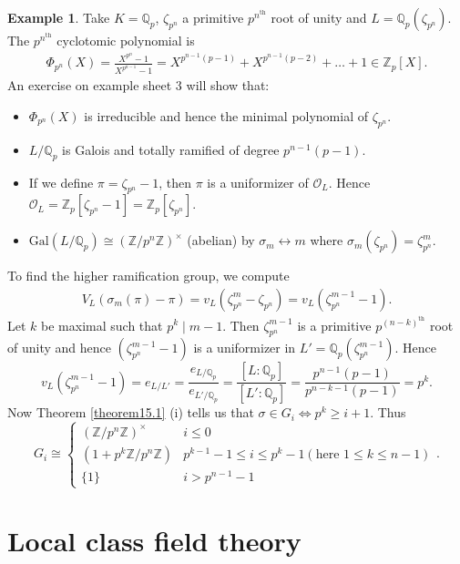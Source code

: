 \documentclass{article}
\theoremstyle{definition}
\newtheorem{example}{Example}[section]
\begin{document}
\begin{example}
    Take $K = \mathbb{Q}_p$, $\zeta_{p^n}$ a primitive $p^{n^{\text{th}}}$ root of unity and $L = \mathbb{Q}_p(\zeta_{p^n})$. The $p^{n^{\text{th}}}$ cyclotomic polynomial is \begin{align*}
        \Phi_{p^n}(X) = \frac{X^{p^n}-1}{X^{p^{n-1}}-1} = X^{p^{n-1}(p-1)} + X^{p^{n-1}(p-2)} + \ldots + 1 \in \mathbb{Z}_p[X].
    \end{align*}
    An exercise on example sheet 3 will show that:
    \begin{itemize}
        \item $\Phi_{p^n}(X)$ is irreducible and hence the minimal polynomial of $\zeta_{p^n}$.
        \item $L/\mathbb{Q}_p$ is Galois and totally ramified of degree $p^{n-1}(p-1)$.
        \item If we define $\pi = \zeta_{p^n}-1$, then $\pi$ is a uniformizer of $\mathcal{O}_L$. Hence $\mathcal{O}_L = \mathbb{Z}_p[\zeta_{p^n}-1] = \mathbb{Z}_p[\zeta_{p^n}]$.
        \item $\text{Gal}(L/\mathbb{Q}_p) \cong (\mathbb{Z}/p^n \mathbb{Z})^\times$ (abelian) by $\sigma_m \leftrightarrow m$ where $\sigma_m(\zeta_{p^n})=\zeta_{p^n}^m$.
    \end{itemize}
    To find the higher ramification group, we compute
    \begin{align*}
        V_L(\sigma_m(\pi)-\pi) = v_L(\zeta_{p^n}^m - \zeta_{p^n}) = v_L(\zeta_{p^n}^{m-1}-1).
    \end{align*}
    Let $k$ be maximal such that $p^k \mid m-1$. Then $\zeta_{p^n}^{m-1}$ is a primitive $p^{(n-k)^{\text{th}}}$ root of unity and hence $(\zeta_{p^n}^{m-1}-1)$ is a uniformizer in $L' = \mathbb{Q}_p(\zeta_{p^n}^{m-1})$. Hence $$v_L(\zeta_{p^n}^{m-1}-1) = e_{L/L'} = \frac{e_{L/\mathbb{Q}_p}}{e_{L'/\mathbb{Q}_p}} = \frac{[L:\mathbb{Q}_p]}{[L':\mathbb{Q}_p]} = \frac{p^{n-1}(p-1)}{p^{n-k-1}(p-1)}=p^k.$$
    Now Theorem \ref{theorem15.1} (i) tells us that $\sigma \in G_i \iff p^k\ge i+1$. Thus $$G_i \cong \begin{cases}
        (\mathbb{Z}/p^n \mathbb{Z})^\times & i\le 0\\
        (1+p^k \mathbb{Z}/p^n\mathbb{Z}) & p^{k-1}-1\le i \le p^k-1 (\text{here }1\le k\le n-1)\\
        \{1\} & i > p^{n-1}-1
    \end{cases}.$$
\end{example}
\section{Local class field theory}
\end{document}
